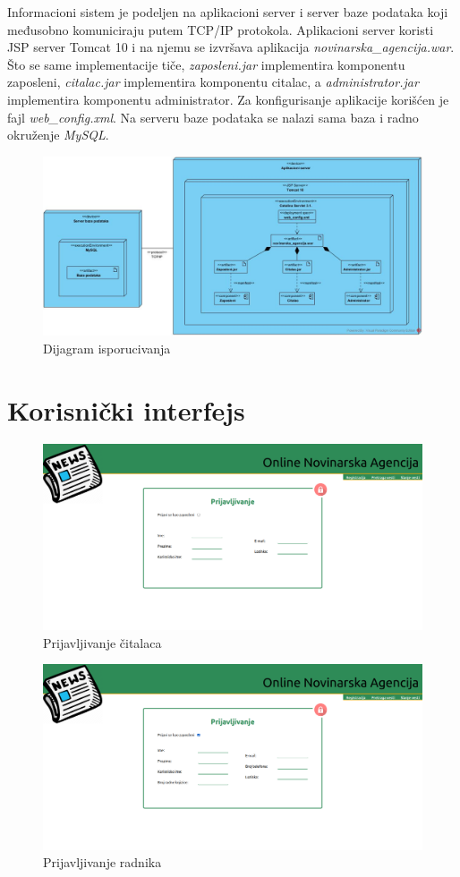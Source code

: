 \documentclass{article}
\begin{document}
\newpage

\newpage

Informacioni sistem je podeljen na aplikacioni server i server baze podataka koji međusobno komuniciraju putem TCP/IP protokola. Aplikacioni server koristi JSP server Tomcat 10 i na njemu se izvršava aplikacija \textit{novinarska\_agencija.war}.
Što se same implementacije tiče, \textit{zaposleni.jar} implementira komponentu zaposleni, \textit{citalac.jar} implementira komponentu citalac, a \textit{administrator.jar} implementira komponentu administrator. Za konfigurisanje aplikacije korišćen je fajl
\textit{web\_config.xml}. Na serveru baze podataka se nalazi sama baza i radno okruženje \textit{MySQL}. 

\begin{figure}[htbp!]
    \centering
    \includegraphics[scale=0.36]{Dijagram_isporucivanja.jpg}
    \caption{Dijagram isporucivanja}
    \label{slk:dtp}
\end{figure}

\newpage
\section{Korisnički interfejs}

\begin{figure}[htbp!]
    \centering
    \includegraphics[scale=0.23]{PrijavaCitalaca.png}
    \caption{Prijavljivanje čitalaca}
    \label{slk:dtp}
\end{figure}

\begin{figure}[htbp!]
    \centering
    \includegraphics[scale=0.23]{PrijavljivanjeRadnika.png}
    \caption{Prijavljivanje radnika}
    \label{slk:dtp}
\end{figure}
\end{document}
